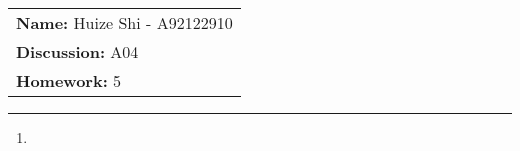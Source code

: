 \documentclass[12pt]{article}
\begin{document}
\null\hfill\begin{tabular}[t]{l@{}}
	\textbf{Name: }Huize Shi - A92122910 \\
	\textbf{Discussion: }A04 \\
	\textbf{Homework: }5
\end{tabular}
\noindent\rule{\textwidth}{0.5pt}

\begin{enumerate}
	\item
\end{enumerate}
\end{document}
